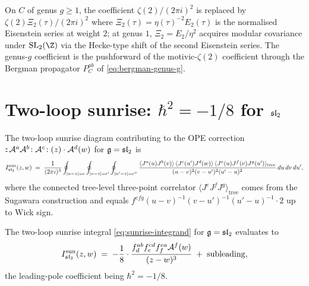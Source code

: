 \begin{remark}
\label{rem:ch-ce-oneloop-higher-genus}
On $C$ of genus $g\ge 1$, the coefficient $\zeta(2)/(2\pi i)^2$ is
replaced by $\zeta(2)\Xi_2(\tau)/(2\pi i)^2$ where
$\Xi_2(\tau) = \eta(\tau)^{-2}E_2(\tau)$ is the normalised Eisenstein
series at weight $2$; at genus $1$, $\Xi_2 = E_2/\eta^2$ acquires
modular covariance under $\mathrm{SL}_2(\Z)$ via the Hecke-type shift
of the second Eisenstein series. The genus-$g$ coefficient is the
pushforward of the motivic-$\zeta(2)$ coefficient through the
Bergman propagator $P^{ab}_C$ of \eqref{eq:bergman-genus-g}.
\end{remark}

\section{Two-loop sunrise: $\hbar^2 = -1/8$ for $\mathfrak{sl}_2$}
\label{sec:ch-ce-twoloop-sunrise}

\begin{definition}
\label{def:sunrise-integrand}
%
The two-loop sunrise diagram contributing to the OPE correction
$:\!:\!\mathcal{A}^a\mathcal{A}^b\!:\mathcal{A}^c\!:(z)\cdot\mathcal{A}^d(w)$ for
$\mathfrak{g} = \mathfrak{sl}_2$ is
\begin{equation}
\label{eq:sunrise-integrand}
I^{\mathrm{sun}}_{\mathfrak{sl}_2}(z,w)
\;=\;
\frac{1}{(2\pi i)^3}
\oint_{|u-z|=\epsilon}
\oint_{|v-z|=\epsilon'}
\oint_{|u'-z|=\epsilon''}
\frac{\langle J^a(u)J^b(v)\rangle\,
\langle J^c(u')J^d(w)\rangle\,
\langle J^e(u)J^f(v)J^g(u')\rangle_{\mathrm{tree}}}
{(u-v)^2(v-u')^2(u'-u)^2}
\,du\,dv\,du',
\end{equation}
where the connected tree-level three-point correlator
$\langle J^e J^f J^g\rangle_{\mathrm{tree}}$ comes from the Sugawara
construction and equals
$f^{efg}(u-v)^{-1}(v-u')^{-1}(u'-u)^{-1}\cdot 2$ up to Wick sign.
\end{definition}

\begin{theorem}
\label{thm:ch-ce-sunrise-sl2-minus-eighth}
%
The two-loop sunrise integral \eqref{eq:sunrise-integrand} for
$\mathfrak{g} = \mathfrak{sl}_2$ evaluates to
\begin{equation}
\label{eq:sunrise-sl2-evaluation}
I^{\mathrm{sun}}_{\mathfrak{sl}_2}(z,w)
\;=\;
-\frac{1}{8}\cdot\frac{f^{ab}_d f^{cd}_e f^{ea}_f\mathcal{A}^f(w)}{(z-w)^3}
\;+\;
\mathrm{subleading},
\end{equation}
the leading-pole coefficient being $\hbar^2 = -1/8$.
\end{theorem}

